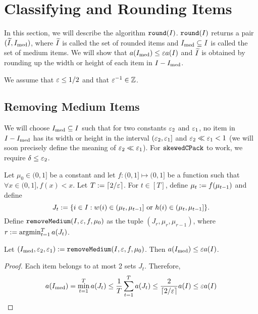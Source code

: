 \section{Classifying and Rounding Items}
\label{sec:thin-bp:round}

In this section, we will describe the algorithm $\operatorname{\mathtt{round}}(I)$.
$\operatorname{\mathtt{round}}(I)$ returns a pair $(\widetilde{I}, I_{\mathrm{med}})$, where $\widetilde{I}$
is called the set of rounded items and
$I_{\mathrm{med}} \subseteq I$ is called the set of medium items.
We will show that $a(I_{\mathrm{med}}) \le \varepsilon a(I)$ and
$\widetilde{I}$ is obtained by rounding up the width or height of each item in $I - I_{\mathrm{med}}$.

We assume that $\varepsilon \le 1/2$ and that $\varepsilon^{-1} \in \mathbb{Z}$.

\subsection{Removing Medium Items}
\label{sec:thin-bp:remmed}

We will choose $I_{\mathrm{med}} \subseteq I$ such that for two constants $\varepsilon_2$ and $\varepsilon_1$,
no item in $I - I_{\mathrm{med}}$ has its width or height in the interval $(\varepsilon_2, \varepsilon_1]$
and $\varepsilon_2 \ll \varepsilon_1 < 1$
(we will soon precisely define the meaning of $\varepsilon_2 \ll \varepsilon_1$).
For $\operatorname{\mathtt{skewedCPack}}$ to work, we require $\delta \le \varepsilon_2$.

\begin{definition}
\label{defn:thin-bp:remmed}
Let $\mu_0 \in (0, 1]$ be a constant and let
$f: (0, 1] \mapsto (0, 1]$ be a function such that $\forall x \in (0, 1], f(x) < x$.
Let $T := \left\lceil 2/\varepsilon \right\rceil$.
For $t \in [T]$, define $\mu_t := f(\mu_{t-1})$ and define
\[ J_t := \{i \in I: w(i) \in (\mu_t, \mu_{t-1}]
    \textrm{ or } h(i) \in (\mu_t, \mu_{t-1}]\}. \]
Define $\operatorname{\mathtt{removeMedium}}(I, \varepsilon, f, \mu_0)$ as the tuple $(J_r, \mu_r, \mu_{r-1})$,
where $r := \operatorname*{argmin}_{t=1}^T a(J_t)$.
\end{definition}

\begin{lemma}
\label{thm:thin-bp:remmed-area}
Let $(I_{\mathrm{med}}, \varepsilon_2, \varepsilon_1) := \operatorname{\mathtt{removeMedium}}(I, \varepsilon, f, \mu_0)$.
Then $a(I_{\mathrm{med}}) \le \varepsilon a(I)$.
\end{lemma}
\begin{proof}
Each item belongs to at most 2 sets $J_t$. Therefore,
\[ a(I_{\mathrm{med}}) = \min_{t=1}^T a(J_t)
\le \frac{1}{T} \sum_{t=1}^T a(J_t)
\le \frac{2}{\left\lceil 2/\varepsilon \right\rceil} a(I)
\le \varepsilon a(I) \qedhere \]
\end{proof}

